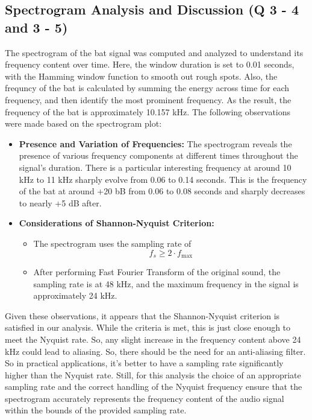 \documentclass[12pt]{article}
\begin{document}
\subsection{Spectrogram Analysis and Discussion (Q 3 - 4 and 3 - 5)}
The spectrogram of the bat signal was computed and analyzed to understand its frequency content over time. Here, the window duration is set to 0.01 seconds, with the Hamming window function to smooth out rough spots. Also, the frequncy of the bat is calculated by summing the energy across time for each frequency, and then identify the most prominent frequency. As the result, the frequency of the bat is approximately 10.157 kHz. The following observations were made based on the spectrogram plot:
\begin{itemize}
    \item \textbf{Presence and Variation of Frequencies: } The spectrogram reveals the presence of various frequency components at different times throughout the signal's duration. There is a particular interesting frequency at around 10 kHz to 11 kHz sharply evolve from 0.06 to 0.14 seconds. This is the frequency of the bat at around +20 bB from 0.06 to 0.08 seconds and sharply decreases to nearly +5 dB after.
    \item \textbf{Considerations of Shannon-Nyquist Criterion: }
        \begin{itemize}
            \item The spectrogram uses the sampling rate of \[f_s \geq 2 \cdot f_{\text{max}}\]
            \item After performing Fast Fourier Transform of the original sound, the sampling rate is at 48 kHz, and the maximum frequency in the signal is approximately 24 kHz.
        \end{itemize}
\end{itemize}
Given these observations, it appears that the Shannon-Nyquist criterion is satisfied in our analysis. While the criteria is met, this is just close enough to meet the Nyquist rate. So, any slight increase in the frequency content above 24 kHz could lead to aliasing. So, there should be the need for an anti-aliasing filter. So in practical applications, it's better to have a sampling rate significantly higher than the Nyquist rate. Still, for this analysis the choice of an appropriate sampling rate and the correct handling of the Nyquist frequency ensure that the spectrogram accurately represents the frequency content of the audio signal within the bounds of the provided sampling rate.
\end{document}
